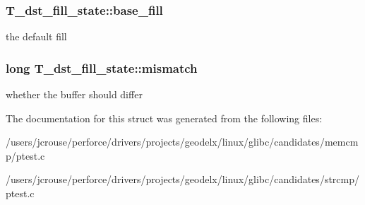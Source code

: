 \subsubsection{ T\_\-dst\_\-fill\_\-state::base\_\-fill}\label{structT__dst__fill__state_m0}


the default fill 
\subsubsection{\setlength{\rightskip}{0pt plus 5cm}long T\_\-dst\_\-fill\_\-state::mismatch}\label{structT__dst__fill__state_m2}


whether the buffer should differ 

The documentation for this struct was generated from the following files:\begin{CompactItemize}
\item 
/users/jcrouse/perforce/drivers/projects/geodelx/linux/glibc/candidates/memcmp/ptest.c\item 
/users/jcrouse/perforce/drivers/projects/geodelx/linux/glibc/candidates/strcmp/ptest.c\end{CompactItemize}
